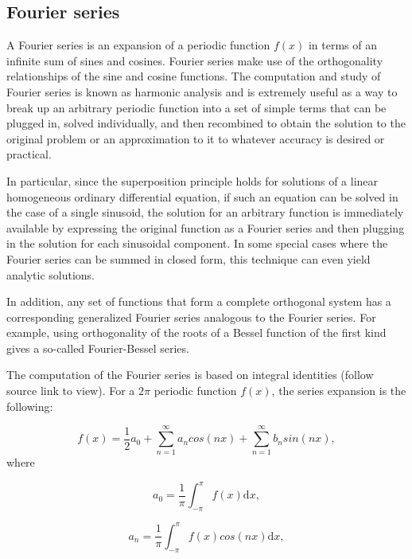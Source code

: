 \documentclass[12pt]{article}
\theoremstyle{plain}
\begin{document}
\subsection{Fourier series}

A Fourier series is an expansion of a periodic function $f(x)$ in terms of an infinite sum of sines and cosines. Fourier series make use of the orthogonality relationships of the sine and cosine functions. The computation and study of Fourier series is known as harmonic analysis and is extremely useful as a way to break up an arbitrary periodic function into a set of simple terms that can be plugged in, solved individually, and then recombined to obtain the solution to the original problem or an approximation to it to whatever accuracy is desired or practical. 

In particular, since the superposition principle holds for solutions of a linear homogeneous ordinary differential equation, if such an equation can be solved in the case of a single sinusoid, the solution for an arbitrary function is immediately available by expressing the original function as a Fourier series and then plugging in the solution for each sinusoidal component. In some special cases where the Fourier series can be summed in closed form, this technique can even yield analytic solutions.

In addition, any set of functions that form a complete orthogonal system has a corresponding generalized Fourier series analogous to the Fourier series. For example, using orthogonality of the roots of a Bessel function of the first kind gives a so-called Fourier-Bessel series.

The computation of the Fourier series is based on integral identities (follow source link to view). For a $2 \pi$ periodic function $f(x)$, the series expansion is the following:

\begin{equation}
f(x) = \frac{1}{2} a_0 + \sum_{n=1}^{\infty} a_n cos(n x) + \sum_{n=1}^{\infty} b_n sin(n x),
\end{equation}
where 

\begin{equation}
a_0 = \frac{1}{\pi} \int_{-\pi}^{\pi} f(x) \text{d}x,
\end{equation}

\begin{equation}
a_n = \frac{1}{\pi} \int_{-\pi}^{\pi} f(x) cos(nx) \text{d}x,
\end{equation}
\end{document}
